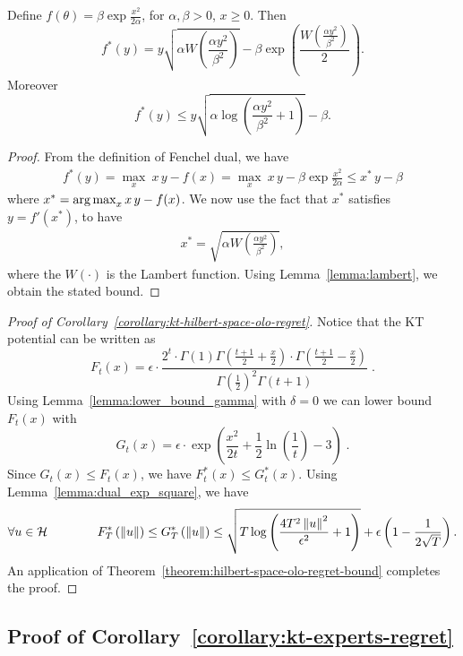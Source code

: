 \begin{lemma}
\label{lemma:dual_exp_square}
Define $f(\theta)= \beta \exp\frac{x^2}{2 \alpha}$, for $\alpha,\beta>0$, $x\geq0$. Then
\[
f^*(y)=y \sqrt{\alpha W\left(\frac{\alpha y^2}{\beta^2}\right)} - \beta \exp\left(\frac{W\left(\frac{\alpha y^2}{\beta^2}\right)}{2}\right).
\]
Moreover
\[
f^*(y) \leq y \sqrt{\alpha \log \left(\frac{\alpha y^2}{\beta^2} +1 \right)} - \beta.
\]
\end{lemma}
\begin{proof}
From the definition of Fenchel dual, we have
\begin{align*}
f^*(y)= \max_{x} \  x\, y - f(x) = \max_{x} \  x\, y - \beta \exp\frac{x^2}{2 \alpha} \leq x^*\,y -\beta
\end{align*}
where $x^*= \operatorname*{arg\,max}_{x} x\, y - f(x)$. We now use the fact that $x^*$ satisfies $y = f'(x^*)$, to have
\begin{align*}
x^*=\sqrt{\alpha W\left(\frac{\alpha y^2}{\beta^2}\right)},
\end{align*}
where the $W(\cdot)$ is the Lambert function.
Using Lemma~\ref{lemma:lambert}, we obtain the stated bound.
\end{proof}


\begin{proof}[Proof of Corollary~\ref{corollary:kt-hilbert-space-olo-regret}]
Notice that the KT potential can be written as
$$
F_t(x) = \epsilon \cdot \frac{2^t \cdot \Gamma(1) \Gamma \left(\frac{t+1}{2} + \frac{x}{2} \right) \cdot \Gamma \left(\frac{t+1}{2} - \frac{x}{2} \right)}{ \Gamma(\frac{1}{2})^2 \Gamma(t+1)} \; .
$$
Using Lemma~\ref{lemma:lower_bound_gamma} with $\delta = 0$ we can lower bound $F_t(x)$ with
$$
G_t(x) = \epsilon \cdot \exp\left(\frac{x^2}{2t} + \frac{1}{2} \ln \left(\frac{1}{t} \right) -3 \right) \; .
$$
Since $G_t(x) \le F_t(x)$, we have $F^*_t(x) \le G_t^*(x)$. Using Lemma~\ref{lemma:dual_exp_square}, we have
\[
\forall u \in \mathcal{H} \qquad \qquad
F^*_T\left(\left\|{u}\right\|\right)
\le G^*_T\left(\left\|{u}\right\|\right)
\le \sqrt{T \log \left(\frac{4 T^2 \left\|{u}\right\|^2}{\epsilon^2} +1 \right)}+\epsilon\left(1-\frac{1}{2\sqrt{T}}\right).
\]
An application of Theorem~\ref{theorem:hilbert-space-olo-regret-bound} completes the proof.
\end{proof}

\subsection{Proof of Corollary~\ref{corollary:kt-experts-regret}}

